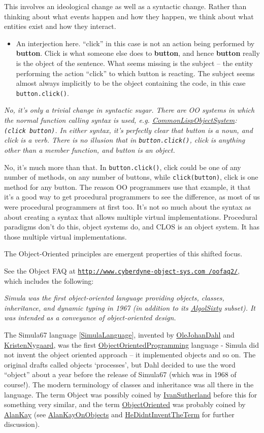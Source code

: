 \documentclass[10pt,twoside,openright]{memoir}
\begin{document}
This involves an ideological change as well as a syntactic change. Rather than thinking about what events happen and how they happen, we think about what entities exist and how they interact.

\begin{itemize}
\item An interjection here. ``click'' in this case is not an action being performed by \textbf{button}. Click is what someone else does to \textbf{button}, and hence \textbf{button} really is the object of the sentence. What seems missing is the subject -- the entity performing the action ``click'' to which button is reacting. The subject seems almost always implicitly to be the object containing the code, in this case \texttt{button.click()}.
\end{itemize}

\emph{No, it's only a trivial change in syntactic sugar. There are OO systems in which the normal function calling syntax is used, e.g. \ul{CommonLispObjectSystem}: \texttt{(click button)}. In either syntax, it's perfectly clear that button is a noun, and click is a verb. There is no illusion that in \texttt{button.click()}, click is anything other than a member function, and button is an object.}

No, it's much more than that. In \texttt{button.click()}, click could be one of any number of methods, on any number of buttons, while \texttt{click(button)}, click is one method for any button. The reason OO programmers use that example, it that it's a good way to get procedural programmers to see the difference, as most of us were procedural programmers at first too. It's not so much about the syntax as about creating a syntax that allows multiple virtual implementations. Procedural paradigms don't do this, object systems do, and CLOS is an object system. It has those multiple virtual implementations.

The Object-Oriented principles are emergent properties of this shifted focus.

See the Object FAQ at \ul{\footnotesize \texttt{http://www.cyberdyne-object-sys.com /oofaq2/}}, which includes the following:

\emph{Simula was the first object-oriented language providing objects, classes, inheritance, and dynamic typing in 1967 (in addition to its \ul{AlgolSixty} subset). It was intended as a conveyance of object-oriented design.}

The Simula67 language [\ul{SimulaLanguage}], invented by \ul{OleJohanDahl} and \ul{KristenNygaard}, was the first \ul{ObjectOrientedProgramming} language - Simula did not invent the object oriented approach -- it implemented objects and so on. The original drafts called objects `processes', but Dahl decided to use the word ``object'' about a year before the release of Simula67 (which was in 1968 of course!). The modern terminology of classes and inheritance was all there in the language. The term Object was possibly coined by \ul{IvanSutherland} before this for something very similar, and the term \ul{ObjectOriented} was probably coined by \ul{AlanKay} (see \ul{AlanKayOnObjects} and \ul{HeDidntInventTheTerm} for further discussion).
\end{document}
